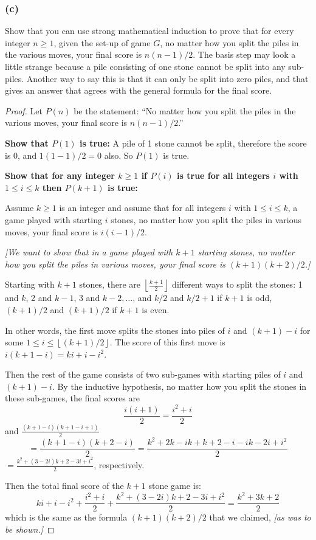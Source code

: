 \documentclass[14pt]{extarticle}
\newcommand{\dps}{\displaystyle}
\newcommand{\floor}[1]{{\left\lfloor#1\right\rfloor}}
\begin{document}
\subsubsection{(c)}
Show that you can use strong mathematical induction to prove that for every integer $n \geq 1$, given the set-up of game $G$, no matter how you split the piles in the various moves, your final score is $n(n - 1)/2$. The basis step may look a little strange because a pile consisting of one stone cannot be split into any sub-piles. Another way to say this is that it can only be split into zero piles, and that gives an answer that agrees with the general formula for the final score.

\begin{proof}
Let $P(n)$ be the statement: ``No matter how you split the piles in the various moves, your final score is $n(n-1)/2$.''

{\bf Show that $P(1)$ is true:} A pile of 1 stone cannot be split, therefore the score is 0, and $1(1-1)/2 = 0$ also. So $P(1)$ is true.

{\bf Show that for any integer $k \geq 1$ if $P(i)$ is true for all integers $i$ with $1 \leq i \leq k$ then $P(k+1)$ is true:}

Assume $k \geq 1$ is an integer and assume that for all integers $i$ with $1 \leq i \leq k$, a game played with 
starting $i$ stones, no matter how you split the piles in various moves, your final score is $i(i-1)/2$.

{\it [We want to show that in a game played with $k+1$ starting stones, no matter how you split the piles in
various moves, your final score is $(k+1)(k+2)/2$.]}

Starting with $k+1$ stones, there are $\dps \floor{\frac{k + 1}{2}}$ different ways to split the stones: 1 and $k$,
2 and $k-1$, 3 and $k-2, \ldots$, and $k/2$ and $k/2 + 1$ if $k+1$ is odd, $(k+1) / 2$ and $(k+1) / 2$ if $k+1$ is even.

In other words, the first move splits the stones into piles of $i$ and $(k+1) - i$ for some $1 \leq i \leq \floor{(k + 1) / 2}$. 
The score of this first move is $i(k+1-i) = ki + i - i^2$.

Then the rest of the game consists of two sub-games with starting piles of $i$ and $(k+1)-i$. By the inductive
hypothesis, no matter how you split the stones in these sub-games, the final scores are 
\[
\frac{i(i+1)}{2} = \frac{i^2 + i}{2}
\] 
and $\dps \frac{(k+1-i)(k+1-i+1)}{2}$
\[
= \frac{(k+1-i)(k+2-i)}{2} = \frac{k^2 + 2k - ik + k + 2 - i - ik - 2i + i^2}{2}
\] 
$\dps = \frac{k^2 + (3 - 2i)k + 2 - 3i + i^2}{2}$, respectively.

Then the total final score of the $k+1$ stone game is:
\[
ki + i - i^2 + \frac{i^2 + i}{2} + \frac{k^2 + (3 - 2i)k + 2 - 3i + i^2}{2} = \frac{k^2 + 3k + 2}{2}
\]
which is the same as the formula $(k+1)(k+2)/2$ that we claimed, {\it [as was to be shown.]}
\end{proof}
\end{document}
